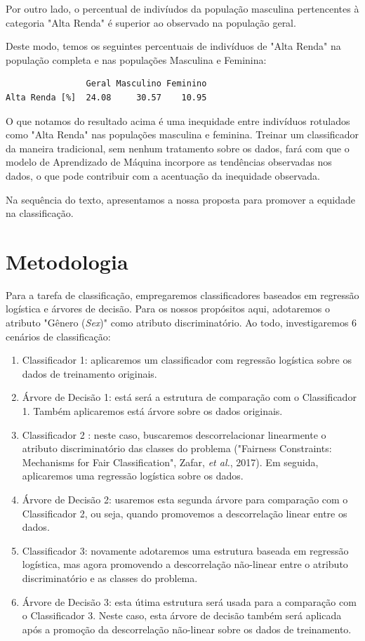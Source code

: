 \documentclass[11pt]{article}
\begin{document}
    Por outro lado, o percentual de indivíudos da população masculina
pertencentes à categoria "Alta Renda" é superior ao observado na
população geral.

Deste modo, temos os seguintes percentuais de indivíduos de "Alta Renda"
na população completa e nas populações Masculina e Feminina:

    
    \begin{verbatim}
                Geral Masculino Feminino
Alta Renda [%]  24.08     30.57    10.95
    \end{verbatim}

    
    O que notamos do resultado acima é uma inequidade entre indivíduos
rotulados como "Alta Renda" nas populações masculina e feminina. Treinar
um classificador da maneira tradicional, sem nenhum tratamento sobre os
dados, fará com que o modelo de Aprendizado de Máquina incorpore as
tendências observadas nos dados, o que pode contribuir com a acentuação
da inequidade observada.

Na sequência do texto, apresentamos a nossa proposta para promover a
equidade na classificação.

    \section{Metodologia}\label{metodologia}

Para a tarefa de classificação, empregaremos classificadores baseados em
regressão logística e árvores de decisão. Para os nossos propósitos
aqui, adotaremos o atributo "Gênero (\emph{Sex})" como atributo
discriminatório. Ao todo, investigaremos 6 cenários de classificação:

\begin{enumerate}
\def\labelenumi{\arabic{enumi})}
\item
  Classificador 1: aplicaremos um classificador com regressão logística
  sobre os dados de treinamento originais.
\item
  Árvore de Decisão 1: está será a estrutura de comparação com o
  Classificador 1. Também aplicaremos está árvore sobre os dados
  originais.
\item
  Classificador 2 : neste caso, buscaremos descorrelacionar linearmente
  o atributo discriminatório das classes do problema ("Fairness
  Constraints: Mechanisms for Fair Classification", Zafar, \emph{et
  al.}, 2017). Em seguida, aplicaremos uma regressão logística sobre os
  dados.
\item
  Árvore de Decisão 2: usaremos esta segunda árvore para comparação com
  o Classificador 2, ou seja, quando promovemos a descorrelação linear
  entre os dados.
\item
  Classificador 3: novamente adotaremos uma estrutura baseada em
  regressão logística, mas agora promovendo a descorrelação não-linear
  entre o atributo discriminatório e as classes do problema.
\item
  Árvore de Decisão 3: esta útima estrutura será usada para a comparação
  com o Classificador 3. Neste caso, esta árvore de decisão também será
  aplicada após a promoção da descorrelação não-linear sobre os dados de
  treinamento.
\end{enumerate}
\end{document}
